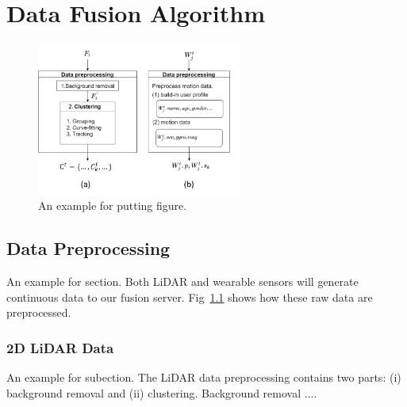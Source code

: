 \chapter{Data Fusion Algorithm}
\label{ch:method}

\begin{figure}[htb]
	\centering
	\includegraphics[width=0.6\textwidth]{img/data_preprocessing.png}
	\caption{An example for putting figure.}
	\label{fig:model}
	\vspace{-10mm}
\end{figure}

\section{Data Preprocessing}
\label{sec:SMA}
An example for section. Both LiDAR and wearable sensors will generate continuous data to our fusion server. Fig~\ref{fig:model} shows how these raw data are preprocessed. 


\subsection{2D LiDAR Data}
An example for subection. The LiDAR data preprocessing contains two parts: (i) background removal and (ii) clustering. Background removal 
....

